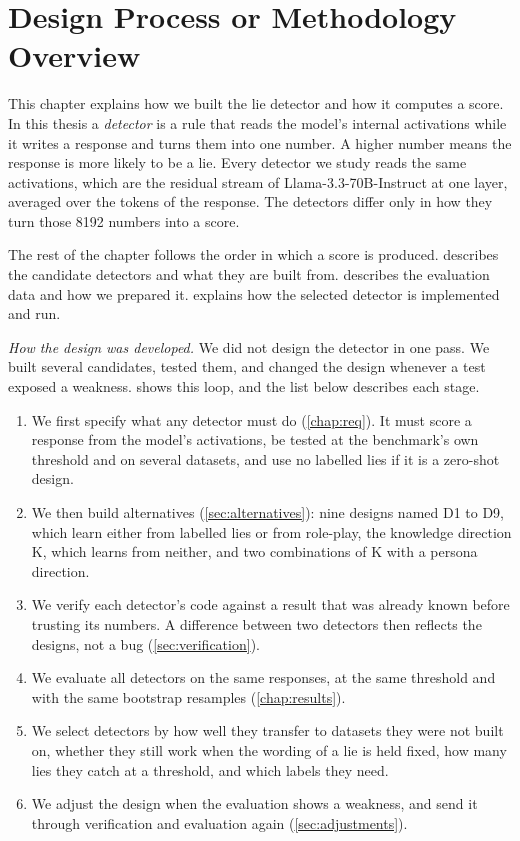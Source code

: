 \label{chap:method}

\section{Design Process or Methodology Overview}
\label{sec:design-overview}

This chapter explains how we built the lie detector and how it computes a score. In this thesis a
\emph{detector} is a rule that reads the model's internal activations while it writes a response and
turns them into one number. A higher number means the response is more likely to be a lie. Every
detector we study reads the same activations, which are the residual stream of
Llama-3.3-70B-Instruct at one layer, averaged over the tokens of the response. The detectors differ only in how they turn those
8192 numbers into a score.

The rest of the chapter follows the order in which a score is produced. 
describes the candidate detectors and what they are built from. 
describes the evaluation data and how we prepared it.  explains how the
selected detector is implemented and run.

\emph{How the design was developed.} We did not design the detector in one pass. We built several
candidates, tested them, and changed the design whenever a test exposed a weakness.
 shows this loop, and the list below describes each stage.

\begin{enumerate}[leftmargin=1.6em, itemsep=2pt]
\item We first specify what any detector must do (\cref{chap:req}). It must score a response from
  the model's activations, be tested at the benchmark's own threshold and on several datasets, and
  use no labelled lies if it is a zero-shot design.
\item We then build alternatives (\cref{sec:alternatives}): nine designs named D1 to D9, which learn
  either from labelled lies or from role-play, the knowledge direction K, which learns from neither,
  and two combinations of K with a persona direction.
\item We verify each detector's code against a result that was already known before trusting its
  numbers. A difference between two detectors then reflects the designs, not a bug
  (\cref{sec:verification}).
\item We evaluate all detectors on the same responses, at the same threshold and with the same
  bootstrap resamples (\cref{chap:results}).
\item We select detectors by how well they transfer to datasets they were not built on, whether
  they still work when the wording of a lie is held fixed, how many lies they catch at a threshold,
  and which labels they need.
\item We adjust the design when the evaluation shows a weakness, and send it through verification
  and evaluation again (\cref{sec:adjustments}).
\end{enumerate}

